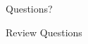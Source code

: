 \documentclass[handout,fleqn,aspectratio=169]{beamer}
\begin{document}
\begin{frame}{}
\vspace{2cm}
\LARGE Questions?


\end{frame}

\begin{frame}{Review Questions}
\bce[1)]
\item 

\ece
\end{frame}
\end{document}
